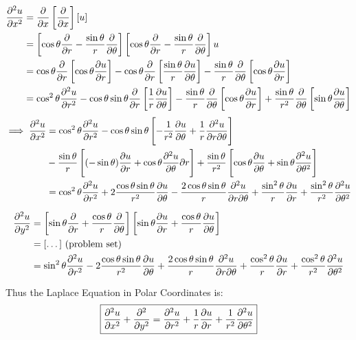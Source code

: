\documentclass[10pt]{scrartcl}
\begin{document}
\begin{enumerate}
\begin{align*}
  \frac{\partial^2u}{\partial x^2} 
  &= \frac{\partial}{\partial x}\left[\frac{\partial}{\partial x}\right][u]\\
  &= \left[\cos\theta\frac{\partial}{\partial r} - \frac{\sin\theta}{r}\frac{\partial}{\partial \theta}\right]\left[\cos\theta \frac{\partial}{\partial r} - \frac{\sin\theta}{r}\frac{\partial}{\partial \theta}\right]u\\
  &= \cos\theta\frac{\partial}{\partial r}\left[\cos\theta\frac{\partial u}{\partial r}\right] - \cos\theta\frac{\partial}{\partial r}\left[\frac{\sin\theta}{r}\frac{\partial u}{\partial \theta}\right] - \frac{\sin\theta}{r}\frac{\partial}{\partial \theta}\left[\cos\theta\frac{\partial u}{\partial r}\right]\\
     &= \cos^2\theta\frac{\partial^2u}{\partial r^2}-\cos\theta\sin\theta\frac{\partial}{\partial r}\left[\frac{1}{r}\frac{\partial u}{\partial \theta}\right] - \frac{\sin\theta}{r}\frac{\partial}{\partial \theta}\left[\cos\theta\frac{\partial u}{\partial r}\right] + \frac{\sin\theta}{r^2}\frac{\partial}{\partial \theta}\left[\sin\theta\frac{\partial u}{\partial \theta}\right]
  \end{align*}
\begin{align*}
 \implies  \frac{\partial^2u}{\partial x^2} 
  &= \cos^2\theta\frac{\partial^2u}{\partial r^2} - \cos\theta\sin\theta\left[-\frac{1}{r^2}\frac{\partial u}{\partial \theta} + \frac{1}{r}\frac{\partial^2u}{\partial r\partial \theta}\right]\\ 
  &- \frac{\sin\theta}{r}\left[(-\sin\theta)\frac{\partial u}{\partial r} + \cos\theta \frac{\partial^2u}{\partial \theta}{\partial r}\right] + \frac{\sin\theta}{r^2}\left[\cos\theta\frac{\partial u}{\partial \theta} + \sin\theta\frac{\partial^2u}{\partial \theta^2}\right]\\
  &= \cos^2\theta \frac{\partial^2u}{\partial r^2} + 2\frac{\cos\theta\sin\theta}{r^2}\frac{\partial u}{\partial \theta} - \frac{2\cos\theta\sin\theta}{r}\frac{\partial^2u}{\partial r\partial \theta} + \frac{\sin^2\theta}{r}\frac{\partial u}{\partial r} + \frac{\sin^2\theta}{r^2}\frac{\partial^2u}{\partial\theta^2}
\end{align*}

\[
\begin{aligned}
  \frac{\partial^2u}{\partial y^2} 
  &= \left[\sin\theta\frac{\partial}{\partial r} + \frac{\cos\theta}{r}\frac{\partial }{\partial \theta}\right]
  \left[\sin\theta \frac{\partial u}{\partial r} + \frac{\cos\theta}{r}\frac{\partial u}{\partial \theta}\right] \\
  &= [\dots] \text{ (problem set)}\\
  &= \sin^2\theta \frac{\partial^2u}{\partial r^2} - 2\frac{\cos\theta\sin\theta}{r^2}\frac{\partial u}{\partial \theta} +\frac{2\cos\theta\sin\theta}{r}\frac{\partial^2u}{\partial r\partial \theta} + \frac{\cos^2\theta}{r}\frac{\partial u}{\partial r} + \frac{\cos^2\theta}{r^2}\frac{\partial^2u}{\partial\theta^2}
\end{aligned}
\]\vsp

Thus the Laplace Equation in Polar Coordinates is: 
\[\boxed{\frac{\partial^2u}{\partial x^2} + \frac{\partial^2}{\partial y^2} = \frac{\partial^2u}{\partial r^2} + \frac{1}{r}\frac{\partial u}{\partial r} + \frac{1}{r^2}\frac{\partial^2u}{\partial \theta^2}}\]
\end{enumerate}
\end{document}
